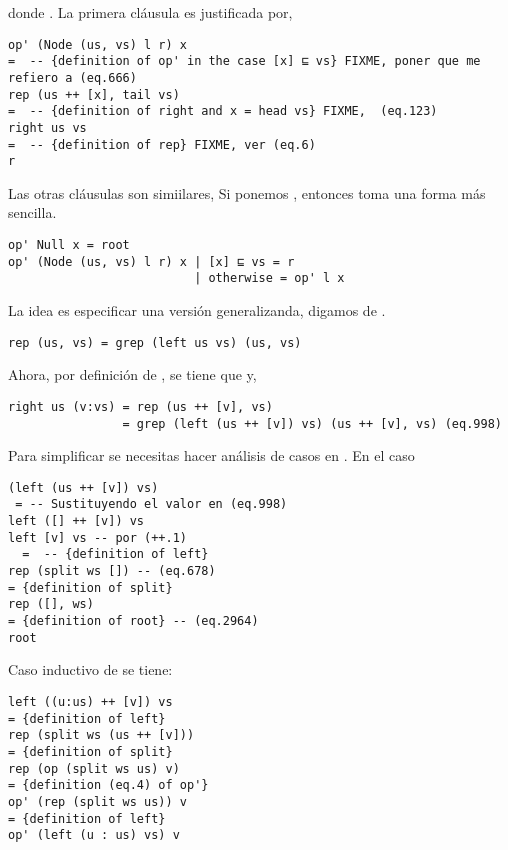 donde . La primera cláusula es justificada por,

\begin{verbatim}
op' (Node (us, vs) l r) x
=  -- {definition of op' in the case [x] ⊑ vs} FIXME, poner que me refiero a (eq.666)
rep (us ++ [x], tail vs)
=  -- {definition of right and x = head vs} FIXME,  (eq.123)
right us vs
=  -- {definition of rep} FIXME, ver (eq.6)
r
\end{verbatim}

Las otras cláusulas son simiilares, Si ponemos , entonces  toma una forma más sencilla.
\begin{verbatim}
op' Null x = root
op' (Node (us, vs) l r) x | [x] ⊑ vs = r
                          | otherwise = op' l x
\end{verbatim}


La idea es especificar una versión generalizanda, digamos  de .

\begin{verbatim}
rep (us, vs) = grep (left us vs) (us, vs)
\end{verbatim}

Ahora, por definición de , se tiene que  y,

\begin{verbatim}
right us (v:vs) = rep (us ++ [v], vs)
                = grep (left (us ++ [v]) vs) (us ++ [v], vs) (eq.998)
\end{verbatim}

Para simplificar  se necesitas hacer análisis de casos en . En el caso 

\begin{verbatim}
(left (us ++ [v]) vs)
 = -- Sustituyendo el valor en (eq.998)
left ([] ++ [v]) vs
left [v] vs -- por (++.1) 
  =  -- {definition of left}
rep (split ws []) -- (eq.678)
= {definition of split}
rep ([], ws)
= {definition of root} -- (eq.2964)
root
\end{verbatim}

Caso inductivo de  se tiene:

\begin{verbatim}
left ((u:us) ++ [v]) vs
= {definition of left}
rep (split ws (us ++ [v]))
= {definition of split}
rep (op (split ws us) v)
= {definition (eq.4) of op'}
op' (rep (split ws us)) v
= {definition of left}
op' (left (u : us) vs) v
\end{verbatim}

